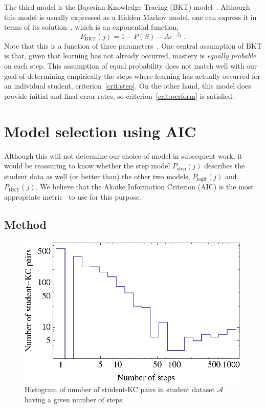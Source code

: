 \documentclass{acmlarge-edm}
\begin{document}
The third model is the Bayesian Knowledge Tracing (BKT) model~\cite{corbett_knowledge_1994}.
Although this model is usually expressed as a Hidden Markov model, 
one can express it in terms of its solution~\cite{van_de_sande_solutions_2012},
which is an exponential function,
%
\begin{equation}
         P_\mathrm{BKT}(j) = 1-P(S) -A e^{-\beta j} \; .
\end{equation}
%
Note that this is a function of three parameters~\cite{van_de_sande_solutions_2012}.
One central assumption of BKT is that, given that learning
has not already occurred, mastery is {\em equally probable} on each step.
This assumption of equal probability does not match well with 
our goal of determining empirically the steps where learning has 
actually occurred for an individual student, criterion~\ref{crit:step}.
On the other hand, this model does provide initial and final
error rates, so criterion~\ref{crit:perform} is satisfied. 

\section{Model selection using AIC}
\label{model-selection}

Although this will not determine our choice of model in subsequent
work, it would be reassuring to know whether the step model 
$P_\mathrm{step}(j)$
describes the student data as well (or better than) the
other two models, $P_\mathrm{logit}(j)$ and $P_\mathrm{BKT}(j)$.  
We believe that the Akaike Information 
Criterion (AIC) is the most appropriate metric~\cite{akaike_new_1974,burnham_model_2002}
to use for this purpose.

\subsection{Method}


\begin{figure}
  \centering \includegraphics{student-kc-length-histogram.eps}
  \caption{Histogram of number of student-KC pairs in student 
    dataset $\mathcal{A}$ having a given number of steps.}
    \label{student-length-histogram}
\end{figure}
\end{document}
